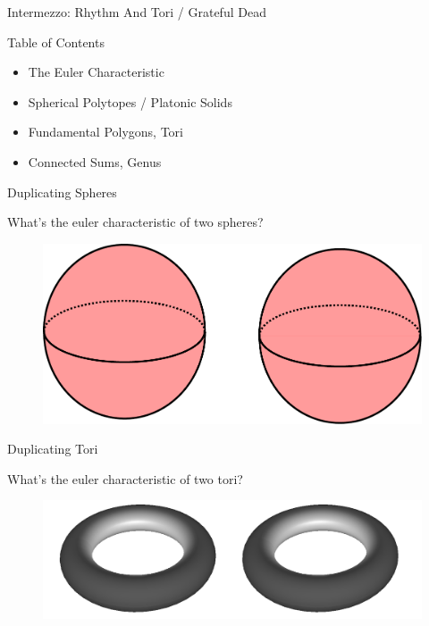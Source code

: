 \documentclass{beamer}
\begin{document}
\begin{frame}{Intermezzo: Rhythm And Tori / Grateful Dead}



\end{frame}


\begin{frame}{Table of Contents}
\begin{itemize}[label=$\vartriangleright$]
	\item The Euler Characteristic
\end{itemize}
\begin{itemize}[label=$\vartriangleright$]
	\item Spherical Polytopes / Platonic Solids
\end{itemize}
\begin{itemize}[label=$\vartriangleright$]
	\item Fundamental Polygons, Tori
\end{itemize}
\begin{itemize}[label=$\blacktriangleright$]
	\item Connected Sums, Genus
\end{itemize}
\end{frame}


\begin{frame}{Duplicating Spheres}

What's the euler characteristic of two spheres?

\begin{figure}[t]
    \includegraphics[width=\textwidth]{2Spheres.pdf}
\end{figure}


\end{frame}


\begin{frame}{Duplicating Tori}

What's the euler characteristic of two tori?

\begin{figure}[t]
    \includegraphics[width=\textwidth]{2Tori.png}
\end{figure}

\end{frame}
\end{document}

